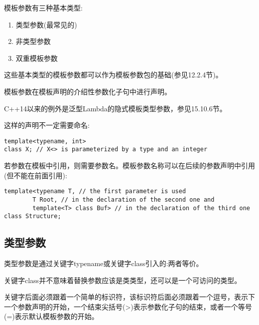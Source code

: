 
模板参数有三种基本类型:

\begin{enumerate}
\item 
类型参数(最常见的)

\item 
非类型参数

\item 
双重模板参数
\end{enumerate}	

这些基本类型的模板参数都可以作为模板参数包的基础(参见12.2.4节)。

模板参数在模板声明的介绍性参数化子句中进行声明。

\begin{tcolorbox}[colback=webgreen!5!white,colframe=webgreen!75!black]
\hspace*{0.75cm}C++14以来的例外是泛型Lambda的隐式模板类型参数，参见15.10.6节。
\end{tcolorbox}

这样的声明不一定需要命名:

\begin{lstlisting}[style=styleCXX]
template<typename, int>
class X; // X<> is parameterized by a type and an integer
\end{lstlisting}

若参数在模板中引用，则需要参数名。模板参数名称可以在后续的参数声明中引用(但不能在前面引用):

\begin{lstlisting}[style=styleCXX]
template<typename T, // the first parameter is used
		T Root, // in the declaration of the second one and
		template<T> class Buf> // in the declaration of the third one
class Structure;
\end{lstlisting}

\subsection{类型参数}

类型参数是通过关键字typename或关键字class引入的:两者等价。

\begin{tcolorbox}[colback=webgreen!5!white,colframe=webgreen!75!black]
\hspace*{0.75cm}关键字class并不意味着替换参数应该是类类型，还可以是一个可访问的类型。
\end{tcolorbox}

关键字后面必须跟着一个简单的标识符，该标识符后面必须跟着一个逗号，表示下一个参数声明的开始，一个结束尖括号(>)表示参数化子句的结束，或者一个等号(=)表示默认模板参数的开始。

